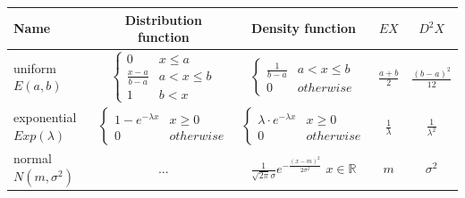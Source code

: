 \documentclass[margin=0px]{article}
\begin{document}
\begin{tabular}{|p{3cm}|c|c|c|c|}
    \hline \textbf{Name}                          & \textbf{Distribution function}                  & \textbf{Density function}                                                        & \textbf{$EX$} & \textbf{$D^{2}X$} \\
    \hline uniform \newline $E(a,b)$
                                                 & $\left\{\begin{array} {lr}
            0               & x \leq a     \\
            \frac{x-a}{b-a} & a < x \leq b \\
            1               & b < x
        \end{array}\right.$
                                                 & $\left\{\begin{array} {lr}
            \frac{1}{b-a} & a < x \leq b \\
            0             & otherwise
        \end{array}\right.$
                                                 & $\frac{a+b}{2}$
                                                 & $\frac{(b-a)^2}{12}$                                                                                                                                             \\
    \hline exponential \newline $Exp(\lambda)$
                                                 & $\left\{\begin{array} {lr}
            1 - e^{-\lambda x} & x \geq 0  \\
            0                  & otherwise
        \end{array}\right.$
                                                 & $\left\{\begin{array} {lr}
            \lambda \cdot e^{-\lambda x} & x \geq 0  \\
            0                            & otherwise
        \end{array}\right.$
                                                 & $\frac{1}{\lambda}$
                                                 & $\frac{1}{\lambda^{2}}$                                                                                                                                          \\
    \hline normal \newline $N(m,\sigma^2)$     & $...$                                      & $\frac{1}{\sqrt{2 \pi}\sigma}e^{-\frac{(x-m)^2}{2\sigma^2}}$ $x \in \mathbb{R}$ & $m$           & $\sigma^2$        \\

\end{tabular}
\end{document}
